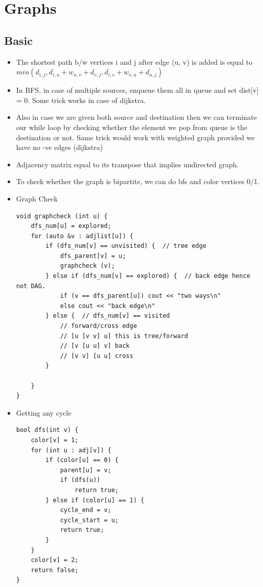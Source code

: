 \documentclass[8pt, a4paper, oneside, twocolumn]{extarticle}
\begin{document}
\section{Graphs}
\subsection{Basic}
\begin{itemize}
    \item The shortest path b/w vertices i and j after edge (u, v) is added is equal to $min(d_{i, j}, d_{i, u} + w_{u, v} + d_{v, j}, d_{i, v} + w_{v, u} + d_{u, j})$
    \item In BFS, in case of multiple sources, enqueue them all in queue and set dist[v] = 0. Some trick works in case of dijkstra.
    \item Also in case we are given both source and destination then we can terminate our while loop by checking whether the element we pop from queue is the destination or not. Same trick would work with weighted graph provided we have no -ve edges (dijkstra)
    \item Adjacency matrix equal to its transpose that implies undirected graph.
    \item To check whether the graph is bipartite, we can do bfs and color vertices 0/1.
    \item Graph Check
    \begin{verbatim}
void graphcheck (int u) {
    dfs_num[u] = explored;
    for (auto &v : adjlist[u]) {
        if (dfs_num[v] == unvisited) {  // tree edge
            dfs_parent[v] = u;
            graphcheck (v);
        } else if (dfs_num[v] == explored) {  // back edge hence not DAG.
            if (v == dfs_parent[u]) cout << "two ways\n"
            else cout << "back edge\n"
        } else {  // dfs_num[v] == visited
            // forward/cross edge
            // [u [v v] u] this is tree/forward
            // [v [u u] v] back
            // [v v] [u u] cross
        }

    }
}
    \end{verbatim}
    \item Getting any cycle
\begin{verbatim}
bool dfs(int v) {
    color[v] = 1;
    for (int u : adj[v]) {
        if (color[u] == 0) {
            parent[u] = v;
            if (dfs(u))
                return true;
        } else if (color[u] == 1) {
            cycle_end = v;
            cycle_start = u;
            return true;
        }
    }
    color[v] = 2;
    return false;
}


\end{verbatim}
\end{itemize}
\end{document}
